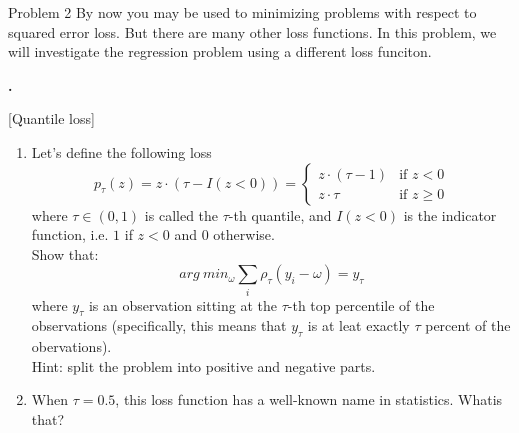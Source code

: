 \documentclass{article}
\newcounter{pcounter}                                   %
\newenvironment{problem}                                %
{                                                       %
    \color{gray}                                        %
    \stepcounter{pcounter}                              %
    \textbf{\arabic{pcounter}.}                         %
}{}                                                     %
\newcommand{\IdenMat}{\textit{I}}                       %
\begin{document}
    \begin{section}{Problem 2}
        \setcounter{pcounter}{0}
        By now you may be used to minimizing problems with respect to squared error loss. But there are many other loss functions. In this problem, we will investigate the regression problem using a different loss funciton.

        \begin{problem}
            [Quantile loss]\\
            \begin{enumerate}[label=(\alph*)]
                \item Let's define the following loss
                $$
                    p_{\tau}(z) = z \cdot (\tau - I(z < 0)) = 
                    \begin{cases}
                        z \cdot (\tau - 1) & \text{if $z < 0$} \\
                        z \cdot \tau & \text{if $z \geq 0$}
                    \end{cases}
                $$
                where $\tau \in (0,1)$ is called the $\tau$-th quantile, and $\IdenMat(z < 0)$ is the indicator function, i.e. $1$ if $z < 0$ and $0$ otherwise.
                \\
                Show that:
                $$
                    arg\ min_{\omega} \sum_{i} \rho_\tau (y_i - \omega) = y_{\tau}
                $$
                where $y_{\tau}$ is an observation sitting at the $\tau$-th top percentile of the observations (specifically, this means that $y_{\tau}$ is at leat exactly $\tau$ percent of the obervations).
                \\
                Hint: split the problem into positive and negative parts.

                \item When $\tau = 0.5$, this loss function has a well-known name in statistics. Whatis that?
            \end{enumerate}
        \end{problem}


\end{section}
\end{document}
